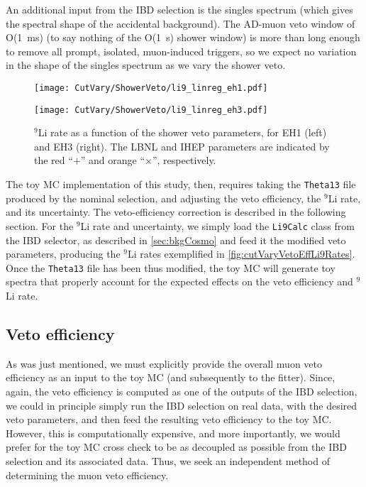 \documentclass[../thesis.tex]{subfiles}
\begin{document}
An additional input from the IBD selection is the singles spectrum (which gives the spectral shape of the accidental background). The AD-muon veto window of O(1~ms) (to say nothing of the O(1~s) shower window) is more than long enough to remove all prompt, isolated, muon-induced triggers, so we expect no variation in the shape of the singles spectrum as we vary the shower veto.

\newcommand\marknom{The LBNL and IHEP parameters are indicated by the red ``$+$'' and orange ``$\times$'', respectively.}

\begin{figure}[ht]
  \begin{minipage}{0.5\linewidth}%
    \texttt{[image: CutVary/ShowerVeto/li9\_linreg\_eh1.pdf]}%
  \end{minipage}%
  \begin{minipage}{0.5\linewidth}%
    \texttt{[image: CutVary/ShowerVeto/li9\_linreg\_eh3.pdf]}%
  \end{minipage}%
  \caption{$^9$Li rate as a function of the shower veto parameters, for EH1 (left) and EH3 (right). \marknom}
  \label{fig:cutVaryVetoEffLi9Rates}
\end{figure}

The toy MC implementation of this study, then, requires taking the \texttt{Theta13} file produced by the nominal selection, and adjusting the veto efficiency, the $^9$Li rate, and its uncertainty. The veto-efficiency correction is described in the following section. For the $^9$Li rate and uncertainty, we simply load the \texttt{Li9Calc} class from the IBD selector, as described in \autoref{sec:bkgCosmo} and feed it the modified veto parameters, producing the $^9$Li rates exemplified in \autoref{fig:cutVaryVetoEffLi9Rates}. Once the \texttt{Theta13} file has been thus modified, the toy MC will generate toy spectra that properly account for the expected effects on the veto efficiency and $^9$Li rate.

\subsection{Veto efficiency}%
\label{sec:cutVaryMuVetoEff}

As was just mentioned, we must explicitly provide the overall muon veto efficiency as an input to the toy MC (and subsequently to the fitter). Since, again, the veto efficiency is computed as one of the outputs of the IBD selection, we could in principle simply run the IBD selection on real data, with the desired veto parameters, and then feed the resulting veto efficiency to the toy MC. However, this is computationally expensive, and more importantly, we would prefer for the toy MC cross check to be as decoupled as possible from the IBD selection and its associated data. Thus, we seek an independent method of determining the muon veto efficiency.
\end{document}

